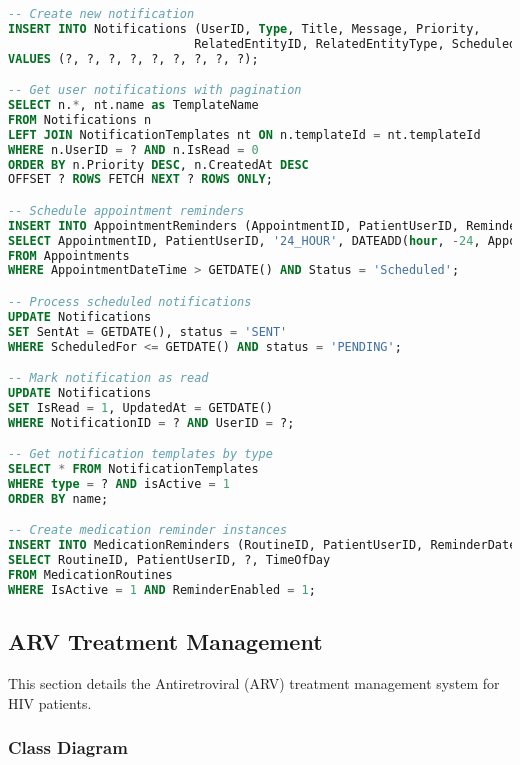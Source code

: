 \documentclass[12pt,a4paper]{article}
\begin{document}
\begin{lstlisting}[language=SQL, caption=Notification Management Queries]
-- Create new notification
INSERT INTO Notifications (UserID, Type, Title, Message, Priority, 
                          RelatedEntityID, RelatedEntityType, ScheduledFor, templateId)
VALUES (?, ?, ?, ?, ?, ?, ?, ?, ?);

-- Get user notifications with pagination
SELECT n.*, nt.name as TemplateName 
FROM Notifications n
LEFT JOIN NotificationTemplates nt ON n.templateId = nt.templateId
WHERE n.UserID = ? AND n.IsRead = 0
ORDER BY n.Priority DESC, n.CreatedAt DESC
OFFSET ? ROWS FETCH NEXT ? ROWS ONLY;

-- Schedule appointment reminders
INSERT INTO AppointmentReminders (AppointmentID, PatientUserID, ReminderType, ReminderDateTime)
SELECT AppointmentID, PatientUserID, '24_HOUR', DATEADD(hour, -24, AppointmentDateTime)
FROM Appointments 
WHERE AppointmentDateTime > GETDATE() AND Status = 'Scheduled';

-- Process scheduled notifications
UPDATE Notifications 
SET SentAt = GETDATE(), status = 'SENT'
WHERE ScheduledFor <= GETDATE() AND status = 'PENDING';

-- Mark notification as read
UPDATE Notifications 
SET IsRead = 1, UpdatedAt = GETDATE()
WHERE NotificationID = ? AND UserID = ?;

-- Get notification templates by type
SELECT * FROM NotificationTemplates 
WHERE type = ? AND isActive = 1 
ORDER BY name;

-- Create medication reminder instances
INSERT INTO MedicationReminders (RoutineID, PatientUserID, ReminderDate, ReminderTime)
SELECT RoutineID, PatientUserID, ?, TimeOfDay
FROM MedicationRoutines 
WHERE IsActive = 1 AND ReminderEnabled = 1;
\end{lstlisting}

\subsection{ARV Treatment Management}

This section details the Antiretroviral (ARV) treatment management system for HIV patients.

\subsubsection{Class Diagram}
\end{document}
